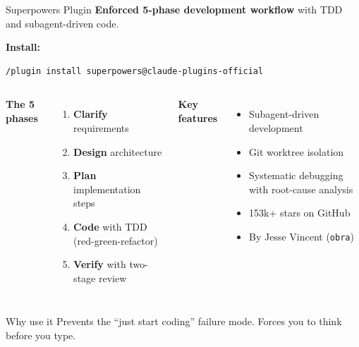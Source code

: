 \documentclass[aspectratio=169]{beamer}
\begin{document}
\begin{frame}[fragile]{Superpowers Plugin}
\textbf{Enforced 5-phase development workflow} with TDD and subagent-driven code.

\smallskip
\textbf{Install:}
\begin{lstlisting}[language=bash]
/plugin install superpowers@claude-plugins-official
\end{lstlisting}

\begin{columns}[T]
\textbf{\color{popblue}The 5 phases}
\begin{enumerate}
  \item \textbf{Clarify} requirements
  \item \textbf{Design} architecture
  \item \textbf{Plan} implementation steps
  \item \textbf{Code} with TDD (red-green-refactor)
  \item \textbf{Verify} with two-stage review
\end{enumerate}

\textbf{\color{paramgreen}Key features}
\begin{itemize}
  \item Subagent-driven development
  \item Git worktree isolation
  \item Systematic debugging with root-cause analysis
  \item 153k+ stars on GitHub
  \item By Jesse Vincent (\texttt{obra})
\end{itemize}
\end{columns}

\begin{alertblock}{Why use it}
Prevents the ``just start coding'' failure mode. Forces you to think before you type.
\end{alertblock}
\end{frame}
\end{document}
